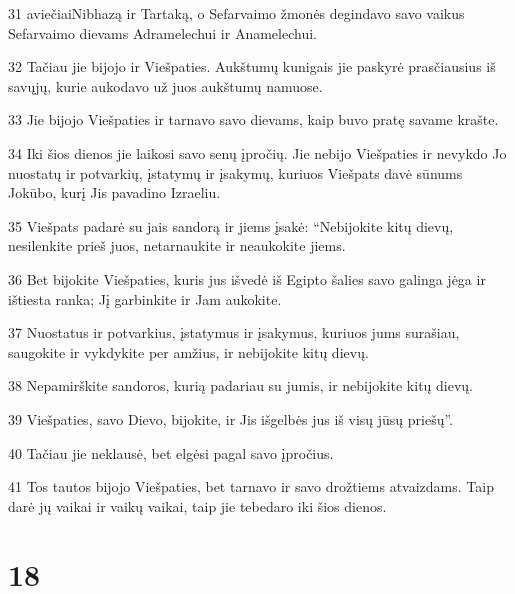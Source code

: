 \par 31 aviečiai­Nibhazą ir Tartaką, o Sefarvaimo žmonės degindavo savo vaikus Sefarvaimo dievams Adramelechui ir Anamelechui. 
\par 32 Tačiau jie bijojo ir Viešpaties. Aukštumų kunigais jie paskyrė prasčiausius iš savųjų, kurie aukodavo už juos aukštumų namuose. 
\par 33 Jie bijojo Viešpaties ir tarnavo savo dievams, kaip buvo pratę savame krašte. 
\par 34 Iki šios dienos jie laikosi savo senų įpročių. Jie nebijo Viešpaties ir nevykdo Jo nuostatų ir potvarkių, įstatymų ir įsakymų, kuriuos Viešpats davė sūnums Jokūbo, kurį Jis pavadino Izraeliu. 
\par 35 Viešpats padarė su jais sandorą ir jiems įsakė: “Nebijokite kitų dievų, nesilenkite prieš juos, netarnaukite ir neaukokite jiems. 
\par 36 Bet bijokite Viešpaties, kuris jus išvedė iš Egipto šalies savo galinga jėga ir ištiesta ranka; Jį garbinkite ir Jam aukokite. 
\par 37 Nuostatus ir potvarkius, įstatymus ir įsakymus, kuriuos jums surašiau, saugokite ir vykdykite per amžius, ir nebijokite kitų dievų. 
\par 38 Nepamirškite sandoros, kurią padariau su jumis, ir nebijokite kitų dievų. 
\par 39 Viešpaties, savo Dievo, bijokite, ir Jis išgelbės jus iš visų jūsų priešų”. 
\par 40 Tačiau jie neklausė, bet elgėsi pagal savo įpročius. 
\par 41 Tos tautos bijojo Viešpaties, bet tarnavo ir savo drožtiems atvaizdams. Taip darė jų vaikai ir vaikų vaikai, taip jie tebedaro iki šios dienos.



\chapter{18}

